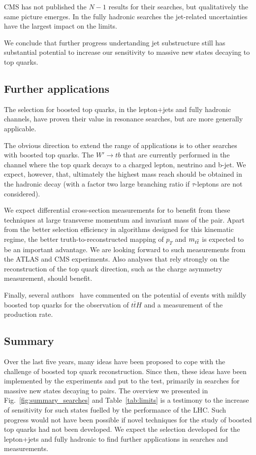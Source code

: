 CMS has not published the $N-1$ results for their searches, but 
qualitatively the same picture emerges. In the fully
hadronic searches the jet-related uncertainties have the largest
impact on the limits.

We conclude that further progress undertanding jet substructure 
still has substantial
potential to increase our sensitivity to massive new states decaying 
to top quarks.

\subsection{Further applications}

The selection for boosted top quarks, in the lepton+jets and fully hadronic
channels, have proven their value in \ttbar{} resonance searches, but
are more generally applicable. 

The obvious direction to extend the 
range of applications is to other searches with boosted top quarks.
The $W' \rightarrow tb$ that are currently performed in the channel
where the top quark decays to a charged lepton, neutrino and b-jet.
We expect, however, that, ultimately the highest mass reach should
be obtained in the hadronic decay (with a factor two large branching
ratio if $\tau$-leptons are not considered).

We expect differential cross-section measurements for \ttbar{} to benefit
from these techniques at large transverse momentum and invariant mass
of the \ttbar{} pair. Apart from the better selection efficiency in
algorithms designed for this kinematic regime, the 
better truth-to-reconstructed mapping of $p_T$ and $m_{t\overline{t}}$ 
is expected to be an important advantage. We are looking forward to 
such measurements from the ATLAS and CMS experiments.
Also analyses that rely
strongly on the reconstruction of the top quark direction, such as
the charge asymmetry measurement, should benefit.

Finally, several authors~\cite{Plehn:2009rk} have commented on the potential
of events with mildly boosted top quarks for the observation of $t\bar{t}H$
and a measurement of the  production rate.


\subsection{Summary}

Over the last five years, many ideas have been proposed to cope with the 
challenge of boosted top quark reconstruction. Since then, these ideas
have been implemented by the experiments and put to the test, primarily
in searches for massive new states decaying to \ttbar{} pairs. The overview
we presented in Fig.~\ref{fig:summary_searches} and Table~\ref{tab:limits}
is a testimony to the increase of sensitivity for such states fuelled
by the performance of the LHC.
Such progress would not have been possible if novel techniques for the 
study of boosted top quarks had not been developed.
We expect the selection developed for the lepton+jets and fully hadronic
to find further applications in searches and measurements.
